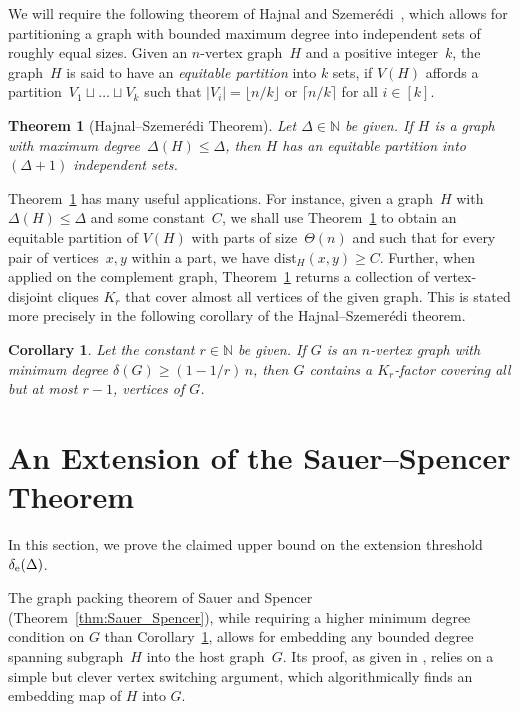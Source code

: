 \documentclass[final]{article}
\newtheorem{theorem}{Theorem}[section]
\newtheorem{cor}{Corollary}[theorem]
\theoremstyle{definition}
\newcommand{\dist}{\mathrm{dist}}
\newcommand{\exth}{\delta_{\rm e}(\Delta)}
\begin{document}
We will require the following theorem of Hajnal and Szemer\'{e}di~\cite{Hajnal_szemeredi}, which allows for partitioning a graph with bounded maximum degree into independent sets of roughly equal sizes. Given an $n$-vertex graph~$H$ and a positive integer~$k$, the graph~$H$ is said to have an \emph{equitable partition} into $k$ sets, if $V(H)$ affords a partition~$V_1 \sqcup \dots \sqcup V_k$ such that $|V_i| = \lfloor n/k \rfloor$ or $\lceil n/k\rceil$ for all $i \in [k]$.

\begin{theorem}[Hajnal--Szemer\'{e}di Theorem]
\label{thm:Hajnal-Szemeredi}
Let $\Delta \in \mathbb{N}$ be given. If\/ $H$ is a graph with maximum degree~$\Delta(H) \leq \Delta$, then\/ $H$ has an equitable partition into\/ $(\Delta + 1)$ independent sets.     
\end{theorem}

Theorem~\ref{thm:Hajnal-Szemeredi} has many useful applications. For instance, given a graph~$H$ with $\Delta(H) \leq \Delta$ and some constant~$C$, we shall use Theorem~\ref{thm:Hajnal-Szemeredi} to obtain an equitable partition of $V(H)$ with parts of size~$\Theta(n)$ and such that for every pair of vertices~$x,y$ within a part, we have $\dist_H(x,y) \geq C$. Further, when applied on the complement graph, Theorem~\ref{thm:Hajnal-Szemeredi} returns a collection of vertex-disjoint cliques $K_r$ that cover almost all vertices of the given graph. This is stated more precisely in the following corollary of the Hajnal--Szemer\'{e}di theorem.

\begin{cor}
    \label{cor:clique_hajnal_szemeredi}
    Let the constant $r \in \mathbb{N}$ be given. If $G$ is an $n$-vertex graph with minimum degree $\delta(G) \geq (1 - 1/r)\,n$, then $G$ contains a $K_r$-factor covering all but at most $r-1$, vertices of $G$. 
\end{cor}

\section{An Extension of the Sauer--Spencer Theorem}
\label{sec:Sauer_Spencer_extension}

In this section, we prove the claimed upper bound on the extension threshold $\exth$.

The graph packing theorem of Sauer and Spencer (Theorem~\ref{thm:Sauer_Spencer}), while requiring a higher minimum degree condition on $G$ than Corollary~\ref{cor:clique_hajnal_szemeredi}, allows for embedding any bounded degree spanning subgraph~$H$ into the host graph~$G$. Its proof, as given in \cite{Sauer_spencer}, relies on a simple but clever vertex switching argument, which algorithmically finds an embedding map of $H$ into $G$. 
\end{document}
